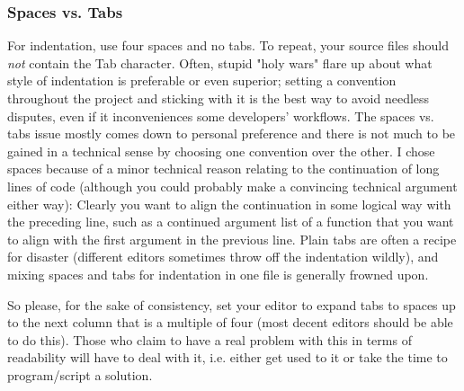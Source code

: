 \documentclass[12pt]{article}
\begin{document}
\subsubsection{Spaces vs. Tabs}
For indentation, use four spaces and no tabs. To repeat, your source files should \emph{not} contain the Tab character. Often, stupid "holy wars" flare up about what style of indentation is preferable or even superior; setting a convention throughout the project and sticking with it is the best way to avoid needless disputes, even if it inconveniences some developers' workflows. The spaces vs. tabs issue mostly comes down to personal preference and there is not much to be gained in a technical sense by choosing one convention over the other. I chose spaces because of a minor technical reason relating to the continuation of long lines of code (although you could probably make a convincing technical argument either way): Clearly you want to align the continuation in some logical way with the preceding line, such as a continued argument list of a function that you want to align with the first argument in the previous line. Plain tabs are often a recipe for disaster (different editors sometimes throw off the indentation wildly), and mixing spaces and tabs for indentation in one file is generally frowned upon.

So please, for the sake of consistency, set your editor to expand tabs to spaces up to the next column that is a multiple of four (most decent editors should be able to do this). Those who claim to have a real problem with this in terms of readability will have to deal with it, i.e. either get used to it or take the time to program/script a solution.
\end{document}
